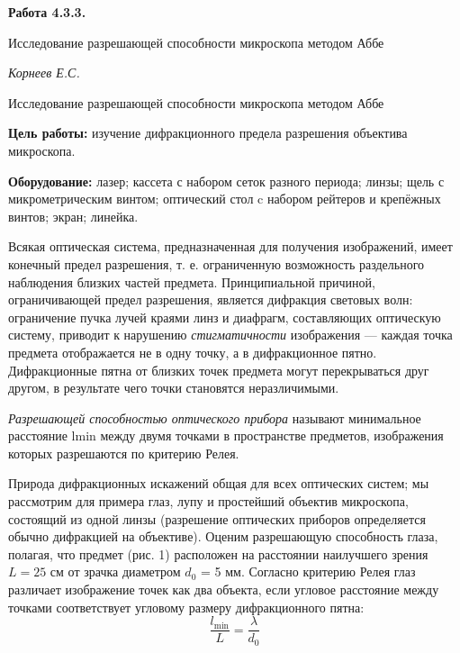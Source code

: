 \documentclass[14pt]{article}
\begin{document}
\begin{titlepage}
	\begin{center}
		\fontsize{18pt}{20pt}\selectfont
		\textbf{Работа 4.3.3.}	
	
		\vspace{5cm}
		\fontsize{24pt}{25pt}\selectfont
		Исследование разрешающей способности микроскопа методом Аббе
	\end{center}
	\begin{flushright}
		\fontsize{18pt}{20pt}\selectfont
		\vspace{14cm}
		\hspace{-3cm}
		\textit{Корнеев Е.С.}
	\end{flushright}		
\end{titlepage}

\begin{center}
	\fontsize{16pt}{18pt}\selectfont	
	Исследование разрешающей способности микроскопа методом Аббе
\end{center}


\fontsize{14pt}{16pt}\selectfont
\vspace{1cm}
\textbf{Цель работы:} изучение дифракционного предела разрешения объектива микроскопа.

\vspace{0.5cm}
\textbf{Оборудование:} лазер; кассета с набором сеток разного
периода; линзы; щель с микрометрическим винтом; оптический стол
c набором рейтеров и крепёжных винтов; экран; линейка.

\vspace{1cm}

Всякая оптическая система, предназначенная для получения изображений,
имеет конечный предел разрешения, т. е. ограниченную возможность
раздельного наблюдения близких частей предмета. Принципиальной
причиной, ограничивающей предел разрешения, является дифракция
световых волн: ограничение пучка лучей краями линз и диафрагм,
составляющих оптическую систему, приводит к нарушению \textsl{стигматичности}
изображения — каждая точка предмета отображается не в одну
точку, а в дифракционное пятно. Дифракционные пятна от близких точек
предмета могут перекрываться друг другом, в результате чего точки
становятся неразличимыми.

\textsl{Разрешающей способностью оптического прибора} называют минимальное
расстояние lmin между двумя точками в пространстве предметов,
изображения которых разрешаются по критерию Релея.

Природа дифракционных искажений общая для всех оптических систем;
мы рассмотрим для примера глаз, лупу и простейший объектив
микроскопа, состоящий из одной линзы (разрешение оптических приборов
определяется обычно дифракцией на объективе).
Оценим разрешающую способность глаза, полагая, что предмет
(рис. 1) расположен на расстоянии наилучшего зрения $L = 25$ см от
зрачка диаметром $d_0$ = 5 мм. Согласно критерию Релея глаз различает
изображение точек как два объекта, если угловое расстояние между
точками соответствует угловому размеру дифракционного пятна:
$$
	\frac{l_\text{min}}{L} = \frac{\lambda}{d_0}
$$
\end{document}
